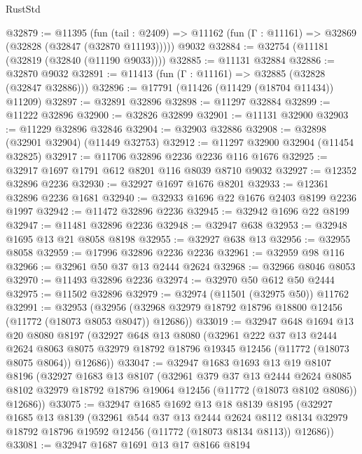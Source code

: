 \begin{lexlean}{RustStd}
\begin{coremodule}
@32879 := @11395
    (fun (tail : @2409) => @11162 (fun (Γ : @11161) => @32869 (@32828 (@32847 (@32870 @11193)))))
    @9032
@32884 := @32754 (@11181 (@32819 (@32840 (@11190 @9033))))
@32885 := @11131 @32884
@32886 := @32870 @9032
@32891 := @11413 (fun (Γ : @11161) => @32885 (@32828 (@32847 @32886)))
@32896 := @17791 (@11426 (@11429 (@18704 @11434)) @11209)
@32897 := @32891 @32896
@32898 := @11297 @32884
@32899 := @11222 @32896
@32900 := @32826 @32899
@32901 := @11131 @32900
@32903 := @11229 @32896 @32846
@32904 := @32903 @32886
@32908 := @32898 (@32901 @32904) (@11449 @32753)
@32912 := @11297 @32900 @32904 (@11454 @32825)
@32917 := @11706 @32896 @2236 @2236 @116 @1676
@32925 := @32917 @1697 @1791 @612 @8201 @116 @8039 @8710 @9032
@32927 := @12352 @32896 @2236
@32930 := @32927 @1697 @1676 @8201
@32933 := @12361 @32896 @2236 @1681
@32940 := @32933 @1696 @22 @1676 @2403 @8199 @2236 @1997
@32942 := @11472 @32896 @2236
@32945 := @32942 @1696 @22 @8199
@32947 := @11481 @32896 @2236
@32948 := @32947 @638
@32953 := @32948 @1695 @13 @21 @8058 @8198
@32955 := @32927 @638 @13
@32956 := @32955 @8058
@32959 := @17996 @32896 @2236 @2236
@32961 := @32959 @98 @116
@32966 := @32961 @50 @37 @13 @2444 @2624
@32968 := @32966 @8046 @8053
@32970 := @11493 @32896 @2236
@32974 := @32970 @50 @612 @50 @2444
@32975 := @11502 @32896
@32979 := @32974 (@11501 (@32975 @50)) @11762
@32991 := @32953
    (@32956 (@32968 @32979 @18792 @18796 @18800 @12456 (@11772 (@18073 @8053 @8047)) @12686))
@33019 := @32947
    @648
    @1694
    @13
    @20
    @8080
    @8197
    (@32927
      @648
      @13
      @8080
      (@32961
        @222
        @37
        @13
        @2444
        @2624
        @8063
        @8075
        @32979
        @18792
        @18796
        @19345
        @12456
        (@11772 (@18073 @8075 @8064))
        @12686))
@33047 := @32947
    @1683
    @1693
    @13
    @19
    @8107
    @8196
    (@32927
      @1683
      @13
      @8107
      (@32961
        @379
        @37
        @13
        @2444
        @2624
        @8085
        @8102
        @32979
        @18792
        @18796
        @19064
        @12456
        (@11772 (@18073 @8102 @8086))
        @12686))
@33075 := @32947
    @1685
    @1692
    @13
    @18
    @8139
    @8195
    (@32927
      @1685
      @13
      @8139
      (@32961
        @544
        @37
        @13
        @2444
        @2624
        @8112
        @8134
        @32979
        @18792
        @18796
        @19592
        @12456
        (@11772 (@18073 @8134 @8113))
        @12686))
@33081 := @32947 @1687 @1691 @13 @17 @8166 @8194

\end{coremodule}
\end{lexlean}
